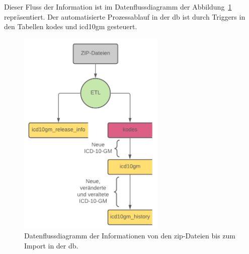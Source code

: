 Dieser Fluss der Information ist im Datenflussdiagramm der Abbildung~\ref{fig:dbflow} repräsentiert. Der automatisierte Prozessablauf in der \ac{db} ist durch Triggers in den Tabellen \glqq\textsf{kodes}\grqq{} und \glqq\textsf{icd10gm}\grqq{} gesteuert.

\begin{figure}[ht]
	\centering
	\includegraphics[height=10cm]{figures/dbflow}
	\caption[Datenfluss des Prozesses]{Datenflussdiagramm der Informationen von den \ac{zip}-Dateien bis zum Import in der \ac{db}.}
	\label{fig:dbflow}
\end{figure} 